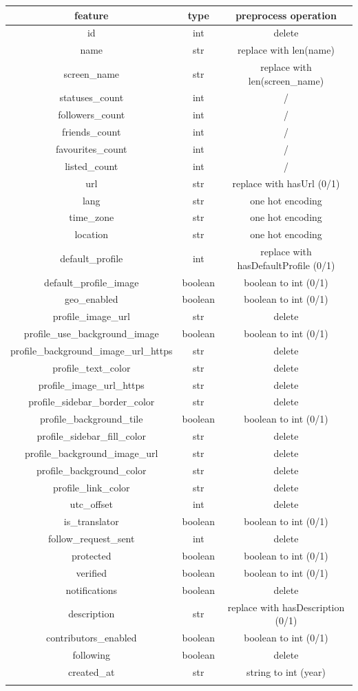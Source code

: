 \small
\begin{center}
	\begin{tabular}{ccc}
		\\feature&type&preprocess operation\\
		\hline\hline
		id&int&delete\\
		name&str&replace with len(name)\\
		screen\_name&str&replace with len(screen\_name)\\
		statuses\_count&int&/\\
		followers\_count&int&/\\
		friends\_count&int&/\\
		favourites\_count&int&/\\
		listed\_count&int&/\\
		url&str&replace with hasUrl (0/1)\\
		lang&str&one hot encoding\\
		time\_zone&str&one hot encoding\\
		location&str&one hot encoding\\
		default\_profile&int&replace with hasDefaultProfile (0/1)\\
		default\_profile\_image&boolean&boolean to int (0/1)\\
		geo\_enabled&boolean&boolean to int (0/1)\\
		profile\_image\_url&str&delete\\
		profile\_use\_background\_image&boolean&boolean to int (0/1)\\
		profile\_background\_image\_url\_https&str&delete\\
		profile\_text\_color&str&delete\\
		profile\_image\_url\_https&str&delete\\
		profile\_sidebar\_border\_color&str&delete\\
		profile\_background\_tile&boolean&boolean to int (0/1)\\
		profile\_sidebar\_fill\_color&str&delete\\
		profile\_background\_image\_url&str&delete\\
		profile\_background\_color&str&delete\\
		profile\_link\_color&str&delete\\
		utc\_offset&int&delete\\
		is\_translator&boolean&boolean to int (0/1)\\
		follow\_request\_sent&int&delete\\
		protected&boolean&boolean to int (0/1)\\
		verified&boolean&boolean to int (0/1)\\
		notifications&boolean&delete\\
		description&str&replace with hasDescription (0/1)\\
		contributors\_enabled&boolean&boolean to int (0/1)\\
		following&boolean&delete\\
		created\_at&str&string to int (year)\\\hline\\
	\end{tabular}
\end{center}

